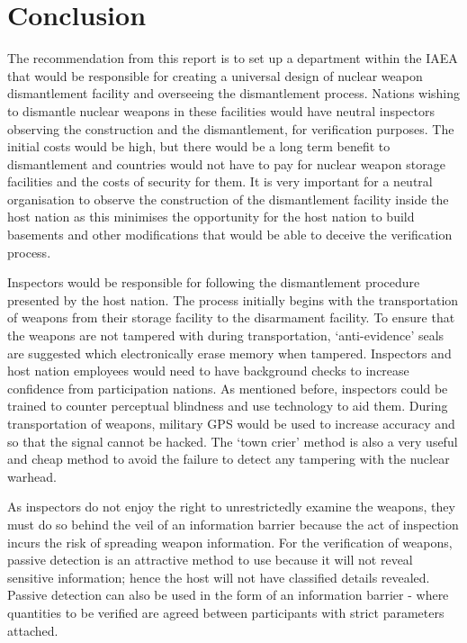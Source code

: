 \documentclass[twoside,titlepage,11pt,twocolumn,a4paper]{article}
\begin{document}
\section{Conclusion}
The recommendation from this report is to set up a department within 
the IAEA that would be responsible for creating a universal design 
of nuclear weapon dismantlement facility and overseeing the 
dismantlement process. Nations wishing to dismantle nuclear 
weapons in these facilities would have neutral inspectors observing
the construction and the dismantlement, for verification purposes. 
The initial costs would be high, but there would be a long term 
benefit to dismantlement and countries would not have to pay for 
nuclear weapon storage facilities and the costs of security for 
them. It is very important for a neutral organisation to observe 
the construction of the dismantlement facility inside the host 
nation as this minimises the opportunity for the host nation to 
build basements and other modifications that would be able to 
deceive the verification process.

Inspectors would be responsible for following the dismantlement
procedure presented by the host nation. The process initially 
begins with the transportation of weapons from their storage 
facility to the disarmament facility. To ensure that the weapons 
are not tampered with during transportation, `anti-evidence' 
seals are suggested which electronically erase memory when 
tampered. Inspectors and host nation employees would need to 
have background checks to increase confidence from participation 
nations. As mentioned before, inspectors could be trained to 
counter perceptual blindness and use technology to aid them. 
During transportation of weapons, military GPS would be used 
to increase accuracy and so that the signal cannot be hacked. 
The ‘town crier’ method is also a very useful and cheap method 
to avoid the failure to detect any tampering with the nuclear warhead.

As inspectors do not enjoy the right to unrestrictedly examine 
the weapons, they must do so behind the veil of an information 
barrier because the act of inspection incurs the risk of spreading 
weapon information. For the verification of weapons, passive 
detection is an attractive method to use because it will not 
reveal sensitive information; hence the host will not have 
classified details revealed. Passive detection can also be 
used in the form of an information barrier - where quantities 
to be verified are agreed between participants with strict 
parameters attached. 
\end{document}
